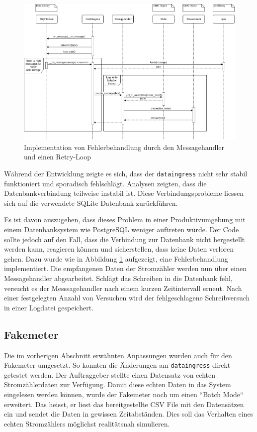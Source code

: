 \begin{figure}[H]
    \centering
    \includegraphics[width=1.0\textwidth]{gfx/dataingress-sequence}
    \caption{
        Implementation von Fehlerbehandlung durch den Messagehandler und einen
        Retry-Loop
    }
    \label{fig:dataingress-sequence}
\end{figure}

Während der Entwicklung zeigte es sich, dass der \texttt{dataingress} nicht sehr stabil
funktioniert und sporadisch fehlschlägt. Analysen zeigten, dass
die Datenbankverbindung teilweise instabil ist.
Diese Verbindungsprobleme liessen sich auf die verwendete SQLite Datenbank zurückführen.

Es ist davon auszugehen, dass dieses Problem in einer Produktivumgebung mit einem Datenbanksystem wie PostgreSQL
weniger auftreten würde.
Der Code sollte jedoch auf den Fall, dass die Verbindung zur Datenbank nicht hergestellt werden kann, reagieren können
und sicherstellen, dass keine Daten verloren gehen.
Dazu wurde wie in Abbildung \ref{fig:dataingress-sequence} aufgezeigt,
eine Fehlerbehandlung implementiert.
Die empfangenen Daten der Stromzähler
werden nun über einen Messagehandler abgearbeitet.
Schlägt das Schreiben in die Datenbank fehl, versucht es der Messsagehandler nach einem kurzen Zeitintervall erneut.
Nach einer festgelegten Anzahl von Versuchen wird der fehlgeschlagene Schreibversuch in einer Logdatei gespeichert.

\subsection{Fakemeter}
Die im vorherigen Abschnitt erwähnten Anpassungen wurden auch für den Fakemeter umgesetzt.
So konnten die Änderungen am \texttt{dataingress} direkt getestet werden.
Der Auftraggeber stellte einen Datensatz von echten Stromzählerdaten
zur Verfügung. Damit diese echten Daten in das System eingelesen werden können,
wurde der Fakemeter noch um einen ``Batch Mode`` erweitert. Das heisst,
er liest das bereitgestellte CSV File mit den Datensätzen ein und sendet die Daten in
gewissen Zeitabständen. Dies soll das Verhalten eines echten Stromzählers
möglichst realitätsnah simulieren.

